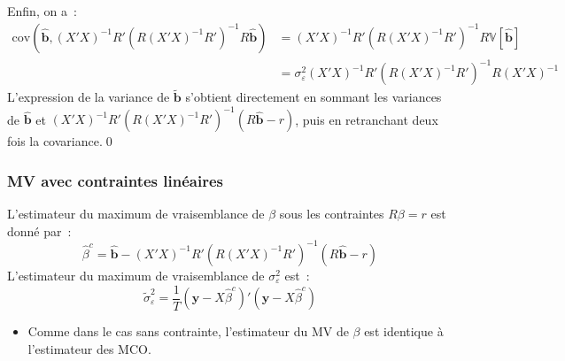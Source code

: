 \documentclass[10pt]{beamer}
\theoremstyle{plain}
\begin{document}
\begin{notes}
\begin{itemize}
{\[  \]}
Enfin, on a~:
{\tiny
\[
  \begin{split}
    \mathrm{cov}\left(\hat{\mathbf b}, (X'X)^{-1}R'\left(R(X'X)^{-1}R'\right)^{-1}R\hat{\mathbf b}\right) &= (X'X)^{-1}R'\left(R(X'X)^{-1}R'\right)^{-1}R\mathbb V\left[ \hat{\mathbf b} \right]\\
    &= \sigma_{\varepsilon}^2(X'X)^{-1}R'\left(R(X'X)^{-1}R'\right)^{-1}R(X'X)^{-1}
  \end{split}
\]}
L'expression de la variance de $\tilde{\mathbf b}$ s'obtient directement en sommant les variances de $\hat{\mathbf b}$ et $(X'X)^{-1}R'\left(R(X'X)^{-1}R'\right)^{-1}\left(R\hat{\mathbf b}-r\right)$, puis en retranchant deux fois la covariance.\qed
\end{itemize}

\end{notes}


\begin{frame}
  \frametitle{MV avec contraintes linéaires}

  \begin{theorem}\label{thm:constrained_ml}
    L'estimateur du maximum de vraisemblance de $\beta$ sous les contraintes $R\beta=r$ est donné par~:
    \[
      \hat{\beta}^c = \hat{\mathbf b} - (X'X)^{-1}R'\left( R(X'X)^{-1}R' \right)^{-1}\left( R\hat{\mathbf b}-r \right)
    \]
    L'estimateur du maximum de vraisemblance de $\sigma_{\varepsilon}^2$ est~:
    \[
      \tilde{\sigma}_{\varepsilon}^2 = \frac{1}{T}\left(\mathbf y - X\hat{\beta}^c\right)'\left(\mathbf y - X\hat{\beta}^c\right)
    \]
  \end{theorem}

  \bigskip

  \begin{itemize}

  \item Comme dans le cas sans contrainte, l'estimateur du MV de $\beta$ est identique à l'estimateur des MCO.\newline

  \end{itemize}

\end{frame}
\end{document}
